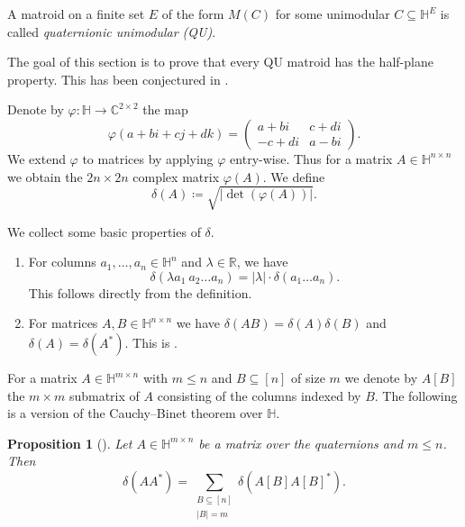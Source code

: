\documentclass[11pt]{article}
\newtheorem{prop}[theo]{Proposition}
\theoremstyle{definition}
\numberwithin{equation}{section}
\newcommand{\R}{{\mathbb R}}
\newcommand{\C}{{\mathbb C}}
\newcommand{\HH}{{\mathbb H}}
\begin{document}
\begin{Def}\label{def:qu}
    A matroid on a finite set $E$ of the form $M(C)$ for some unimodular $C\subseteq\HH^E$ is called \emph{quaternionic unimodular (QU)}.
\end{Def}

The goal of this section is to prove that every QU matroid has the half-plane property. This has been conjectured in \cite[Conjecture~6.9]{skewpartial}.


\begin{Def}
    Denote by $\varphi\colon\HH\to\C^{2\times 2}$ the map 
\begin{equation*}
    \varphi(a+bi+cj+dk)=
    \begin{pmatrix}
        a+bi& c+di\\
        -c+di& a-bi
    \end{pmatrix}.
\end{equation*}
    We extend $\varphi$ to matrices by applying $\varphi$ entry-wise. Thus for a matrix $A\in\HH^{n\times n}$ we obtain the $2n\times2n$ complex matrix $\varphi(A)$. We define
    \begin{equation*}
      \delta(A)\coloneqq \sqrt{|\det(\varphi(A))|}.  
    \end{equation*}
\end{Def}

\begin{rem}\label{rem:deltaHom}We collect some basic properties of $\delta$.
\begin{enumerate}
    \item For columns $a_1,\ldots,a_n\in\HH^n$ and $\lambda\in\R$, we have
    \begin{equation*}
      \delta(\lambda a_1\ a_2\ldots a_n)=|\lambda|\cdot\delta(a_1\ldots a_n).  
    \end{equation*}
    This follows directly from the definition.
    \item For matrices $A,B\in\HH^{n\times n}$ we have $\delta(AB)=\delta(A)\delta(B)$ and $\delta(A)=\delta(A^*)$. This is \cite[Lemma~5.2]{skewpartial}.
\end{enumerate}
\end{rem}

For a matrix $A\in\HH^{m\times n}$ with $m\leq n$ and $B\subseteq[n]$ of size $m$ we denote by $A[B]$ the $m\times m$ submatrix of $A$ consisting of the columns indexed by $B$.
The following is a version of the Cauchy--Binet theorem over $\HH$.

\begin{prop}[{\cite[Theorem 5.1]{skewpartial}}]\label{prop:CauchyBinetQuat}
    Let $A\in\HH^{m\times n}$ be a matrix over the quaternions and $m\leq n$. Then
    \begin{equation*}
        \delta(AA^*)=\sum_{\substack{B\subseteq[n]\\|B|=m}}\delta(A[B]A[B]^*).
    \end{equation*}
\end{prop}
\end{document}
